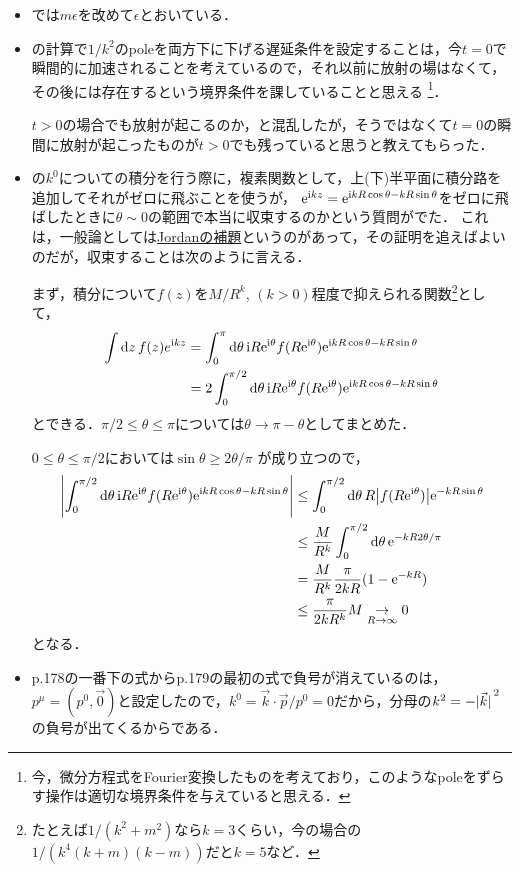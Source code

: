 	\begin{itemize}
	\item {}では$m\epsilon$を改めて$\epsilon$とおいている．

	\item {}の計算で$1/k^2$のpoleを両方下に下げる遅延条件を設定することは，今$t=0$で瞬間的に加速されることを考えているので，それ以前に放射の場はなくて，その後には存在するという境界条件を課していることと思える
	\footnote{今，微分方程式をFourier変換したものを考えており，このようなpoleをずらす操作は適切な境界条件を与えていると思える．}．

	$t>0$の場合でも放射が起こるのか，と混乱したが，そうではなくて$t=0$の瞬間に放射が起こったものが$t>0$でも残っていると思うと教えてもらった．
	\item {}の$k^0$についての積分を行う際に，複素関数として，上(下)半平面に積分路を追加してそれがゼロに飛ぶことを使うが，
	$\mathrm{e}^{\mathrm{i} kz} = \mathrm{e}^{\mathrm{i} kR\cos\theta - kR\sin\theta}$をゼロに飛ばしたときに$\theta \sim 0$の範囲で本当に収束するのかという質問がでた．
	これは，一般論としては\href{https://ja.wikipedia.org/wiki/\%E3\%82\%B8\%E3\%83\%A7\%E3\%83\%AB\%E3\%83\%80\%E3\%83\%B3\%E3\%81\%AE\%E8\%A3\%9C\%E9\%A1\%8C}{Jordanの補題}というのがあって，その証明を追えばよいのだが，収束することは次のように言える．

	まず，積分について$f(z)$を$M/R^k$, $(k>0)$程度で抑えられる関数\footnote{たとえば$1/(k^2 + m^2)$なら$k=3$くらい，今の場合の$1/(k^4(k+m)(k-m))$だと$k=5$など．}として，
	\begin{align}
		\int \dd{z}f(z)e^{\mathrm{i} kz} &= \int_{0}^{\pi} \dd{\theta}\mathrm{i} R\mathrm{e}^{\mathrm{i}\theta} f(R\mathrm{e}^{\mathrm{i}\theta})\mathrm{e}^{\mathrm{i} kR\cos\theta - kR\sin\theta}\\
		&= 2\int_{0}^{\pi/2} \dd{\theta}\mathrm{i} R\mathrm{e}^{\mathrm{i}\theta} f(R\mathrm{e}^{\mathrm{i}\theta})\mathrm{e}^{\mathrm{i} kR\cos\theta - kR\sin\theta}\\
	\end{align}
	とできる．$\pi/2 \leq \theta \leq \pi$については$\theta \to \pi-\theta$としてまとめた．

	$0 \leq \theta \leq \pi/2$においては$\sin\theta \geq 2\theta/\pi$
	が成り立つので，
	\begin{align}
		\abs{\int_{0}^{\pi/2} \dd{\theta}\mathrm{i} R\mathrm{e}^{\mathrm{i}\theta} f(R\mathrm{e}^{\mathrm{i}\theta})\mathrm{e}^{\mathrm{i} kR\cos\theta - kR\sin\theta}}
		&\leq \int_{0}^{\pi/2}\dd{\theta}R\abs{f(R\mathrm{e}^{\mathrm{i}\theta})}\mathrm{e}^{-kR\sin\theta}\\
		&\leq \frac{M}{R^k}\int_{0}^{\pi/2}\dd{\theta}\mathrm{e}^{-kR2\theta/\pi}\\
		&= \frac{M}{R^k}\frac{\pi}{2kR}(1 - \mathrm{e}^{-kR})\\
		&\leq \frac{\pi}{2kR^k}M \underset{R\to\infty}{\to} 0
	\end{align}
	となる．
	\item p.178の一番下の式からp.179の最初の式で負号が消えているのは，$p^{\mu} = (p^0, \vec{0})$と設定したので，$k^0 = \vec{k}\cdot \vec{p}/p^0 = 0$だから，分母の$k^2 = -\abs*{\vec{k}}^2$の負号が出てくるからである．


\end{itemize}
